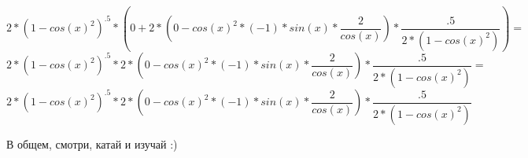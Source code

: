 \documentclass[a4paper,12pt]{article}
\begin{document}
\begin{equation}
{{{2 }* {\left( {1 }- {{cos \left( {x }\right) }^ {2 }}\right) }}^ {.5 }}* {\left( {0 }+ {{{2 }* {\left( {0 }- {{{cos \left( {x }\right) }^ {2 }}* {{{\left( -1 \right) }* {sin \left( {x }\right) }}* {\frac{{2 }}{{cos \left( {x }\right) }}}}}\right) }}* {\frac{{.5 }}{{{2 }* {\left( {1 }- {{cos \left( {x }\right) }^ {2 }}\right) }}}}}\right) }=
\end{equation}
\begin{equation}
{{{2 }* {\left( {1 }- {{cos \left( {x }\right) }^ {2 }}\right) }}^ {.5 }}* {{{2 }* {\left( {0 }- {{{cos \left( {x }\right) }^ {2 }}* {{{\left( -1 \right) }* {sin \left( {x }\right) }}* {\frac{{2 }}{{cos \left( {x }\right) }}}}}\right) }}* {\frac{{.5 }}{{{2 }* {\left( {1 }- {{cos \left( {x }\right) }^ {2 }}\right) }}}}}=
\end{equation}
\begin{equation}
{{{2 }* {\left( {1 }- {{cos \left( {x }\right) }^ {2 }}\right) }}^ {.5 }}* {{{2 }* {\left( {0 }- {{{cos \left( {x }\right) }^ {2 }}* {{{\left( -1 \right) }* {sin \left( {x }\right) }}* {\frac{{2 }}{{cos \left( {x }\right) }}}}}\right) }}* {\frac{{.5 }}{{{2 }* {\left( {1 }- {{cos \left( {x }\right) }^ {2 }}\right) }}}}}
\end{equation}

В общем, смотри, катай и изучай :)
\end{document}
